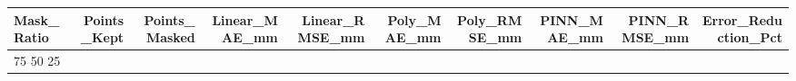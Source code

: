 \begin{tabular}{lrrrrrrrrr}
\toprule
Mask_Ratio & Points_Kept & Points_Masked & Linear_MAE_mm & Linear_RMSE_mm & Poly_MAE_mm & Poly_RMSE_mm & PINN_MAE_mm & PINN_RMSE_mm & Error_Reduction_Pct \\
\midrule
75%
50%
25%
\bottomrule
\end{tabular}
